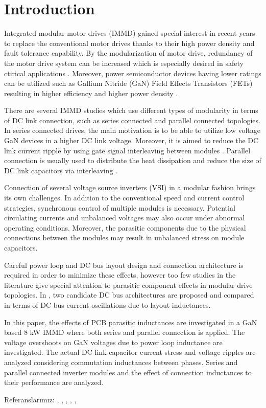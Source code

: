 \section{Introduction}\label{sec:Intro}
Integrated modular motor drives (IMMD) gained special interest in recent years to replace the conventional motor drives thanks to their high power density and fault tolerance capability. By the modularization of motor drive, redundancy of the motor drive system can be increased which is especially desired in safety ctirical applications \cite{Zhang2017}. Moreover, power semiconductor devices having lower ratings can be utilized such as Gallium Nitride (GaN) Field Effects Transistors (FETs) resulting in higher efficiency and higher power density \cite{Wang2015b}.

There are several IMMD studies which use different types of modularity in terms of DC link connection, such as series connected \cite{Wang2015b} and parallel connected \cite{Zhang2017} topologies. In series connected drives, the main motivation is to be able to utilize low voltage GaN devices in a higher DC link voltage. Moreover, it is aimed to reduce the DC link current ripple by using gate signal interleaving between modules \cite{Wang2013}. Parallel connection is usually used to distribute the heat dissipation and reduce the size of DC link capacitors via interleaving \cite{Ugur2017}.

Connection of several voltage source inverters (VSI) in a modular fashion brings its own challenges. In addition to the conventional speed and current control strategies, synchronous control of multiple modules is necessary. Potential circulating currents and unbalanced voltages may also occur under abnormal operating conditions. Moreover, the parasitic components due to the physical connections between the modules may result in unbalanced stress on module capacitors.

Careful power loop and DC bus layout design and connection architecture is required in order to minimize these effects, however too few studies in the literature give special attention to parasitic component effects in modular drive topologies. In \cite{Brown2007}, two candidate DC bus architectures are proposed and compared in terms of DC bus current oscillations due to layout inductances.

In this paper, the effects of PCB parasitic inductances are investigated in a GaN based 8 kW IMMD where both series and parallel connection is applied. The voltage overshoots on GaN voltages due to power loop inductance are investigated. The actual DC link capacitor current stress and voltage ripples are analyzed considering commutation inductances between phases. Series and parallel connected inverter modules and the effect of connection inductances to their performance are analyzed.

Referanslarımız: \cite{Zhang2017}, \cite{Zlwka}, \cite{Wang2015b}, \cite{Brown2007}, \cite{Ugur2017}, \cite{Wang2013}


